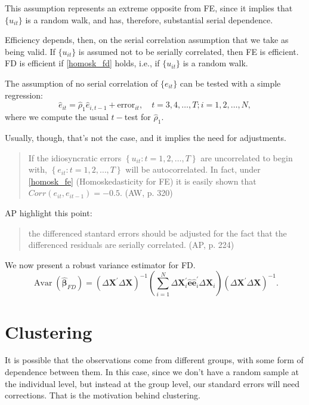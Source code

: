 \documentclass[11pt, a4paper]{report}
\theoremstyle{plain}
\theoremstyle{plain}
\theoremstyle{remark}
\begin{document}
This assumption represents an extreme opposite from FE, since it implies that $\{u_{it}\}$ is a random walk, and has, therefore, substantial serial dependence. 

Efficiency depends, then, on the serial correlation assumption that we take as being valid. If $\{u_{it}\}$ is assumed not to be serially correlated, then FE is efficient. FD is efficient if \ref{homosk_fd} holds, i.e., if $\{u_{it}\}$ is a random walk. 

The assumption of no serial correlation of $\{e_{it}\}$ can be tested with a simple regression: 
\begin{equation}
    \hat{e}_{i t}=\hat{\rho}_{1} \hat{e}_{i, t-1}+\text {error}_{i t}, \quad t=3,4, \ldots, T ; i=1,2, \ldots, N,
    \end{equation}
where we compute the usual $t-$test for $\hat{\rho}_1$.

Usually, though, that's not the case, and it implies the need for adjustments. 
\begin{quote}
    If the idiosyncratic errors $\left\{u_{i t}: t=1,2, \ldots, T\right\}$ are uncorrelated to begin with,
    $\left\{e_{i t}: t=1,2, \ldots, T\right\}$ will be autocorrelated. In fact, under \ref{homosk_fe} (Homoskedasticity for FE) it is easily shown that $Corr(e_{it}, e_{it-1}) = -0.5$. (AW, p. 320)
\end{quote}

AP highlight this point: 
\begin{quote}
    the differenced stantard errors should be adjusted for the fact that the differenced residuals are serially correlated. (AP, p. 224)
\end{quote}

We now present a robust variance estimator for FD. 
\begin{equation}
    \operatorname{Avar}\left(\hat{\boldsymbol{\beta}}_{F D}\right)=\left(\Delta \mathbf{X}^{\prime} \Delta \mathbf{X}\right)^{-1}\left(\sum_{i=1}^{N} \Delta \mathbf{X}_{i}^{\prime} \hat{\mathbf{e}} \hat{\mathbf{e}}_{i}^{\prime} \Delta \mathbf{X}_{i}\right)\left(\Delta \mathbf{X}^{\prime} \Delta \mathbf{X}\right)^{-1}.
\end{equation}



\section{Clustering}

It is possible that the observations come from different groups, with some form of dependence between them. In this case, since we don't have a random sample at the individual level, but instead at the group level, our standard errors will need corrections. That is the motivation behind clustering. 
\end{document}
